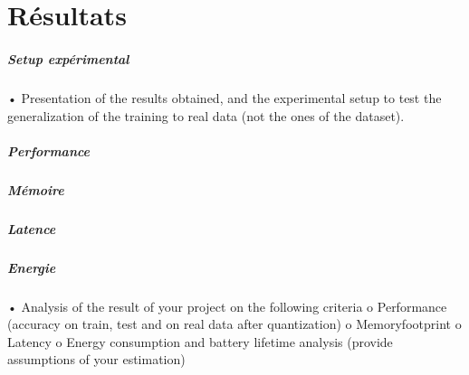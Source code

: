 \chapter{Résultats}

\paragraph{Setup expérimental}
• Presentation of the results obtained, and the experimental setup to test the generalization of
the training to real data (not the ones of the dataset).


\paragraph{Performance}
\paragraph{Mémoire}
\paragraph{Latence}
\paragraph{Energie}
• Analysis of the result of your project on the following criteria
o Performance (accuracy on train, test and on real data after quantization)
o Memoryfootprint
o Latency
o Energy consumption and battery lifetime analysis (provide assumptions of your
estimation)

